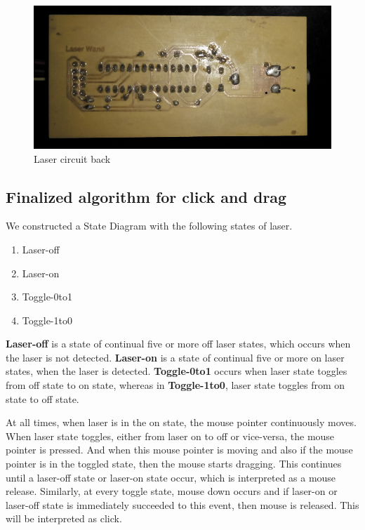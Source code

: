 \documentclass[12pt, a4paper]{article}
\begin{document}
\begin{figure}[htp]
	\centering
	\includegraphics[scale=0.15]{back.png}
	\caption{Laser circuit back}
	\label{}
\end{figure}


\subsection{Finalized algorithm for click and drag}
	We constructed a State Diagram with the following states of laser.
\begin{enumerate}
\item Laser-off
\item Laser-on
\item Toggle-0to1
\item Toggle-1to0
\end{enumerate}

	\textbf {Laser-off} is a state of continual five or more off laser states, which occurs when the laser is not detected. \textbf{Laser-on} is a state of continual five or more on laser states, when the laser is detected. \textbf{Toggle-0to1} occurs when laser state toggles from off state to on state, whereas in \textbf{Toggle-1to0}, laser state toggles from on state to off state. 
	
	At all times, when laser is in the on state, the mouse pointer continuously moves. When laser state toggles, either from laser on to off or vice-versa, the mouse pointer is pressed. And when this mouse pointer is moving and also if the mouse pointer is in the toggled state, then the mouse starts dragging. This continues until a laser-off state or laser-on state occur, which is interpreted as a mouse release. Similarly, at every toggle state, mouse down occurs and if laser-on or laser-off state is immediately succeeded to this event, then mouse is released. This will be interpreted as click.
	
\end{document}
